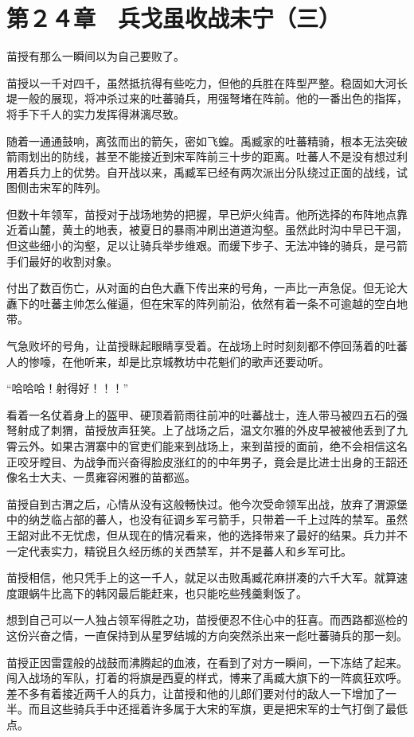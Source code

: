 \section{第２４章　兵戈虽收战未宁（三）}

苗授有那么一瞬间以为自己要败了。

苗授以一千对四千，虽然抵抗得有些吃力，但他的兵胜在阵型严整。稳固如大河长堤一般的展现，将冲杀过来的吐蕃骑兵，用强弩堵在阵前。他的一番出色的指挥，将手下千人的实力发挥得淋漓尽致。

随着一通通鼓响，离弦而出的箭矢，密如飞蝗。禹臧家的吐蕃精骑，根本无法突破箭雨划出的防线，甚至不能接近到宋军阵前三十步的距离。吐蕃人不是没有想过利用着兵力上的优势。自开战以来，禹臧军已经有两次派出分队绕过正面的战线，试图侧击宋军的阵列。

但数十年领军，苗授对于战场地势的把握，早已炉火纯青。他所选择的布阵地点靠近着山麓，黄土的地表，被夏日的暴雨冲刷出道道沟壑。虽然此时沟中早已干涸，但这些细小的沟壑，足以让骑兵举步维艰。而缓下步子、无法冲锋的骑兵，是弓箭手们最好的收割对象。

付出了数百伤亡，从对面的白色大纛下传出来的号角，一声比一声急促。但无论大纛下的吐蕃主帅怎么催逼，但在宋军的阵列前沿，依然有着一条不可逾越的空白地带。

气急败坏的号角，让苗授眯起眼睛享受着。在战场上时时刻刻都不停回荡着的吐蕃人的惨嚎，在他听来，却是比京城教坊中花魁们的歌声还要动听。

“哈哈哈！射得好！！！”

看着一名仗着身上的盔甲、硬顶着箭雨往前冲的吐蕃战士，连人带马被四五石的强弩射成了刺猬，苗授放声狂笑。上了战场之后，温文尔雅的外皮早被被他丢到了九霄云外。如果古渭寨中的官吏们能来到战场上，来到苗授的面前，绝不会相信这名正咬牙瞠目、为战争而兴奋得脸皮涨红的的中年男子，竟会是比进士出身的王韶还像名士大夫、一贯雍容闲雅的苗都巡。

苗授自到古渭之后，心情从没有这般畅快过。他今次受命领军出战，放弃了渭源堡中的纳芝临占部的蕃人，也没有征调乡军弓箭手，只带着一千上过阵的禁军。虽然王韶对此不无忧虑，但从现在的情况看来，他的选择带来了最好的结果。兵力并不一定代表实力，精锐且久经历练的关西禁军，并不是蕃人和乡军可比。

苗授相信，他只凭手上的这一千人，就足以击败禹臧花麻拼凑的六千大军。就算速度跟蜗牛比高下的韩冈最后能赶来，也只能吃些残羹剩饭了。

想到自己可以一人独占领军得胜之功，苗授便忍不住心中的狂喜。而西路都巡检的这份兴奋之情，一直保持到从星罗结城的方向突然杀出来一彪吐蕃骑兵的那一刻。

苗授正因雷霆般的战鼓而沸腾起的血液，在看到了对方一瞬间，一下冻结了起来。闯入战场的军队，打着的将旗是西夏的样式，博来了禹臧大旗下的一阵疯狂欢呼。差不多有着接近两千人的兵力，让苗授和他的儿郎们要对付的敌人一下增加了一半。而且这些骑兵手中还摇着许多属于大宋的军旗，更是把宋军的士气打倒了最低点。

